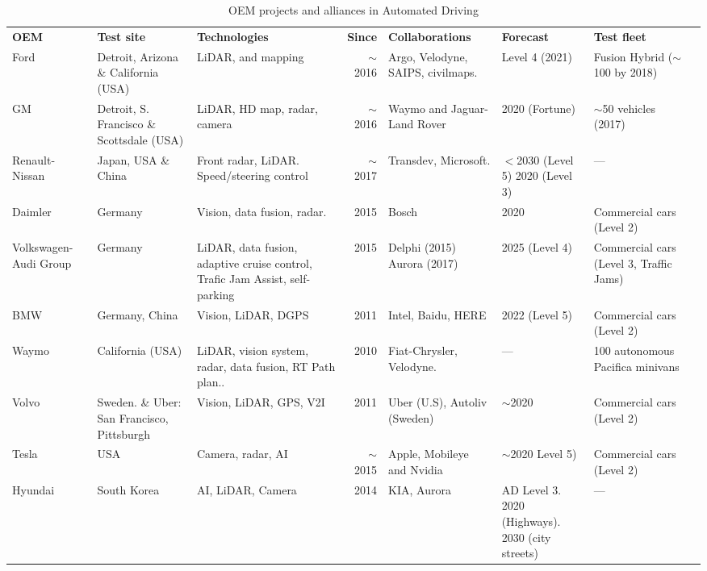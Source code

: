 \documentclass[journal]{IEEEtran}
\newcommand{\ra}[1]{\renewcommand{\arraystretch}{#1}}
\begin{document}
\begin{table}%
	\ra{1.3}
	\caption{OEM projects and alliances in Automated Driving}
	\label{tab:oem-ad}
	\begin{tabular}{@{}p{1.5cm}p{2.5cm}p{3.0cm}r*{2}{p{2.5cm}}p{2cm}p{3cm}@{}} 
		\toprule
		\textbf{OEM} & \textbf{Test site} & \textbf{Technologies} &
		\textbf{Since} & \textbf{Collaborations} & \textbf{Forecast} & 
		\textbf{Test fleet} 
		\\    
		\cmidrule(r{4pt}){1-1} \cmidrule(l){2-7}
		Ford & Detroit, Arizona \& California (USA) & LiDAR, and mapping  & 
		$\sim$2016 & Argo, Velodyne, SAIPS, civilmaps. & Level 4 (2021) & 
		Fusion Hybrid ($\sim$100 by 2018)
		\\
		GM & Detroit, S. Francisco \& Scottsdale (USA) & LiDAR, 
		HD map, radar, camera & $\sim$2016 & Waymo and 
		Jaguar-Land Rover & 2020 (Fortune) & $\sim$50 vehicles (2017) 
		\\
		Renault-Nissan & Japan, USA \& China & Front radar, LiDAR. 
		Speed/steering control & $\sim$2017 & Transdev, Microsoft. & 
		\parbox[t][][t]{2cm}{$<$2030 (Level 5)\\ 2020 (Level 3)} 
		& --- 
		\\
		Daimler & Germany & Vision, data fusion, radar. & 2015 & 
		Bosch & 2020 & Commercial cars (Level 2) 
		\\
		Volkswagen-Audi Group & Germany & LiDAR, data fusion, adaptive cruise 
		control, Trafic Jam Assist, self-parking & 2015 & 
		\parbox[t][][t]{2.2cm}{Delphi (2015) \\ Aurora (2017)} & 2025 (Level 4) 
		& Commercial cars (Level 3, Traffic Jams) 
		\\ 
		BMW & Germany, China & Vision, LiDAR, DGPS & 2011 & Intel, Baidu, HERE 
		& 2022 (Level 5) & 
		Commercial cars (Level 2) 
		\\
		Waymo & California (USA) & LiDAR, vision system, radar, data fusion, 
		RT 
		Path plan.. & 2010 & Fiat-Chrysler,  Velodyne. & --- & 100 autonomous 
		Pacifica minivans  
		\\
		Volvo & Sweden. \& Uber: San Francisco, Pittsburgh  & Vision, LiDAR, 
		GPS, 
		V2I & 2011 & Uber (U.S), Autoliv (Sweden)  & $\sim$2020 & Commercial 
		cars 
		(Level 2) 
		\\
		Tesla & USA & Camera, radar, AI & $\sim$2015 & Apple, Mobileye and 
		Nvidia 
		& 
		$\sim$2020 Level 5)  & Commercial cars (Level 2) \\
		Hyundai & South Korea & AI, LiDAR, Camera & 2014 & KIA, Aurora & 
		\parbox[t][][t]{2.2cm}{AD Level 3.\\2020 (Highways).\\2030 (city 
			streets)} & --- 
		\\
		\bottomrule  
	\end{tabular}
\end{table}
\end{document}
